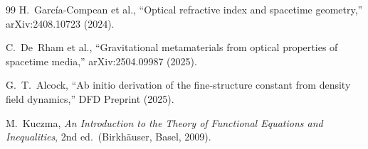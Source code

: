 \documentclass[aps,prd,twocolumn,superscriptaddress,nofootinbib]{revtex4-2}
\begin{document}
\begin{thebibliography}{99}
H.~Garc\'{i}a-Compean et al.,
``Optical refractive index and spacetime geometry,''
arXiv:2408.10723 (2024).

C.~De~Rham et al.,
``Gravitational metamaterials from optical properties of spacetime media,''
arXiv:2504.09987 (2025).

G.~T.~Alcock,
``Ab initio derivation of the fine-structure constant from density
field dynamics,''
DFD Preprint (2025).

M.~Kuczma,
\emph{An Introduction to the Theory of Functional Equations and
Inequalities}, 2nd ed.\ (Birkh\"{a}user, Basel, 2009).

\end{thebibliography}
\end{document}
